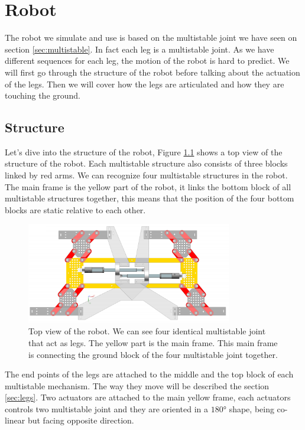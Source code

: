 \chapter{Robot}
    The robot we simulate and use is based on the multistable joint we have seen on section \ref{sec:multistable}. In fact each leg is a multistable joint. As we have different sequences for each leg, the motion of the robot is hard to predict. We will first go through the structure of the robot before talking about the actuation of the legs. Then we will cover how the legs are articulated and how they are touching the ground. 
    
    \section{Structure}
        Let's dive into the structure of the robot, Figure \ref{fig:robot_top_view} shows a top view of the structure of the robot. Each multistable structure also consists of three blocks linked by red arms. We can recognize four multistable structures in the robot. The main frame is the yellow part of the robot, it links the bottom block of all multistable structures together, this means that the position of the four bottom blocks are static relative to each other. 
        \begin{figure}
            \centering
            \includegraphics[width=0.8\textwidth]{images/top_view_robot.png}
            \caption{Top view of the robot. We can see four identical multistable joint that act as legs. The yellow part is the main frame. This main frame is connecting the ground block of the four multistable joint together. }
            \label{fig:robot_top_view}
        \end{figure}
        
        The end points of the legs are attached to the middle and the top block of each multistable mechanism. The way they move will be described the section \ref{sec:legs}. Two actuators are attached to the main yellow frame, each actuators controls two multistable joint and they are oriented in a $180°$ shape, being co-linear but facing opposite direction. 
        
